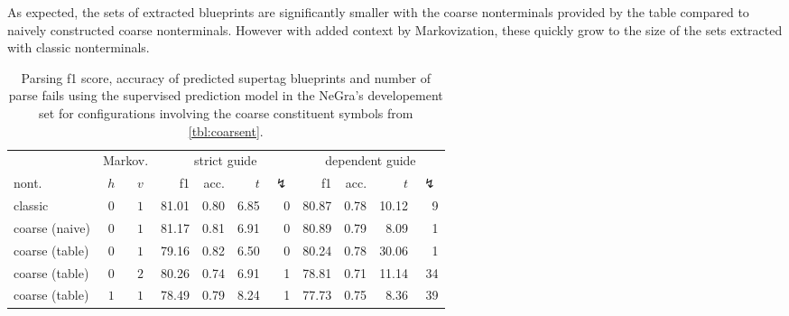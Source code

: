 \documentclass[../../document.tex]{subfiles}
\begin{document}
    As expected, the sets of extracted blueprints are significantly smaller with the coarse nonterminals provided by the table compared to naively constructed coarse nonterminals.
    However with added context by Markovization, these quickly grow to the size of the sets extracted with classic nonterminals.
    
    \begin{table}
        \caption{\label{tbl:gridsearch:coarse:2}
        Parsing f1 score, accuracy of predicted supertag blueprints and number of parse fails using the supervised prediction model in the NeGra's developement set for configurations involving the coarse constituent symbols from \cref{tbl:coarsent}.
        }
        \centering
        \vspace{.2cm}
        \begin{tabular}{lcc|rrrr|rrrr}
            \toprule
& \multicolumn{2}{c|}{Markov.}         & \multicolumn{4}{c|}{strict guide} &  \multicolumn{4}{c}{dependent guide} \\
nont.           & \(h\) & \(v\) & f1 & acc. & $t$ & $\lightning$ & f1 & acc. & $t$ & $\lightning$  \\ \hline\rowcolor{black!10}
classic         & \(0\) & \(1\) & 81.01 & 0.80 & 6.85 & 0 & 80.87 & 0.78 & 10.12 & 9 \\ \rowcolor{black!10}
coarse (naive)  & \(0\) & \(1\) & 81.17 & 0.81 & 6.91 & 0 & 80.89 & 0.79 & 8.09 & 1  \\\hline
coarse (table)  & \(0\) & \(1\) & 79.16 & 0.82 & 6.50 & 0 & 80.24 & 0.78 & 30.06 & 1 \\
coarse (table)  & \(0\) & \(2\) & 80.26 & 0.74 & 6.91 & 1 & 78.81 & 0.71 & 11.14 & 34 \\
coarse (table)  & \(1\) & \(1\) & 78.49 & 0.79 & 8.24 & 1 & 77.73 & 0.75 & 8.36 & 39 \\
\bottomrule
        \end{tabular}
    \end{table}
\end{document}
